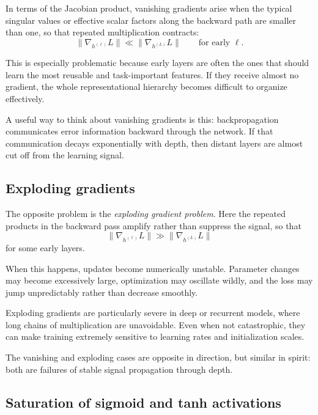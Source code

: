 \medskip

In terms of the Jacobian product,
vanishing gradients arise when the typical singular values or effective scalar factors along the backward path are smaller than one, so that repeated multiplication contracts:
\[
\|\nabla_{h^{(\ell)}}L\| \ll \|\nabla_{h^{(L)}}L\|
\qquad\text{for early }\ell.
\]

\medskip

This is especially problematic because early layers are often the ones that should learn the most reusable and task-important features.
If they receive almost no gradient, the whole representational hierarchy becomes difficult to organize effectively.

\medskip

A useful way to think about vanishing gradients is this:
backpropagation communicates error information backward through the network.
If that communication decays exponentially with depth, then distant layers are almost cut off from the learning signal.

\subsection*{Exploding gradients}

The opposite problem is the \emph{exploding gradient problem}.
Here the repeated products in the backward pass amplify rather than suppress the signal, so that
\[
\|\nabla_{h^{(\ell)}}L\| \gg \|\nabla_{h^{(L)}}L\|
\]
for some early layers.

\medskip

When this happens, updates become numerically unstable.
Parameter changes may become excessively large, optimization may oscillate wildly, and the loss may jump unpredictably rather than decrease smoothly.

\medskip

Exploding gradients are particularly severe in deep or recurrent models, where long chains of multiplication are unavoidable.
Even when not catastrophic, they can make training extremely sensitive to learning rates and initialization scales.

\medskip

The vanishing and exploding cases are opposite in direction, but similar in spirit:
both are failures of stable signal propagation through depth.

\subsection*{Saturation of sigmoid and tanh activations}

